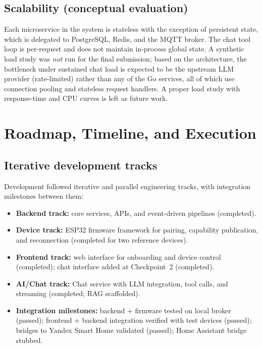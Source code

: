 \documentclass[a4paper,12pt]{article}
\begin{document}
\subsection{Scalability (conceptual evaluation)}

Each microservice in the system is stateless with the exception of persistent state, which is delegated to PostgreSQL, Redis, and the MQTT broker. The chat tool loop is per-request and does not maintain in-process global state. A synthetic load study was \emph{not} run for the final submission; based on the architecture, the bottleneck under sustained chat load is expected to be the upstream LLM provider (rate-limited) rather than any of the Go services, all of which use connection pooling and stateless request handlers. A proper load study with response-time and CPU curves is left as future work.

\newpage

\section{Roadmap, Timeline, and Execution}
\label{sec:roadmap}

\subsection{Iterative development tracks}

Development followed iterative and parallel engineering tracks, with integration milestones between them:

\begin{itemize}
  \item \textbf{Backend track:} core services, APIs, and event-driven pipelines (completed).
  \item \textbf{Device track:} ESP32 firmware framework for pairing, capability publication, and reconnection (completed for two reference devices).
  \item \textbf{Frontend track:} web interface for onboarding and device control (completed); chat interface added at Checkpoint~2 (completed).
  \item \textbf{AI/Chat track:} Chat service with LLM integration, tool calls, and streaming (completed; RAG scaffolded).
  \item \textbf{Integration milestones:} backend + firmware tested on local broker (passed); frontend + backend integration verified with test devices (passed); bridges to Yandex Smart Home validated (passed); Home Assistant bridge stubbed.
\end{itemize}
\end{document}
